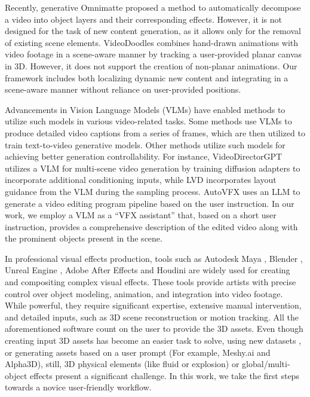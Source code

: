 Recently, generative Omnimatte \cite{generative-omnimatte} proposed a method to automatically decompose a video into object layers and their corresponding effects. However, it is not designed for the task of new content generation, as it allows only for the removal of existing scene elements. VideoDoodles \cite{videodoodles} combines hand-drawn animations with video footage in a scene-aware manner by tracking a user-provided planar canvas in 3D. However, it does not support the creation of non-planar animations. Our framework includes both localizing dynamic new content and integrating in a scene-aware manner without reliance on user-provided positions. 


Advancements in Vision Language Models (VLMs) have enabled 
methods to utilize such models in various video-related tasks. Some methods \cite{Chen2024Panda70MC7,yang2024cogvideox} use VLMs to produce detailed video captions from a series of frames, which are then utilized to train text-to-video generative models.
Other methods utilize such models for achieving better generation controllability. For instance, VideoDirectorGPT \cite{Lin2023VideoDirectorGPT} utilizes a VLM for multi-scene video generation by training diffusion adapters to incorporate additional conditioning inputs, while LVD \cite{lian2023llmgroundedvideo} incorporates layout guidance from the VLM during the sampling process. AutoVFX \cite{hsu2024autovfx} uses an LLM to generate a video editing program pipeline based on the user instruction. In our work, we employ a VLM as a ``VFX assistant'' that, based on a short user instruction, provides a comprehensive description of the edited video along with the prominent objects present in the scene.

In professional visual effects production, tools such as Autodesk Maya \cite{maya}, Blender \cite{blender}, Unreal Engine \cite{unrealengine}, Adobe After Effects \cite{christiansen2013adobe} and Houdini \cite{houdini} are widely used for creating and compositing complex visual effects. These tools provide artists with precise control over object modeling, animation, and integration into video footage. While powerful, they require significant expertise, extensive manual intervention, and detailed inputs, such as 3D scene reconstruction or motion tracking. All the aforementioned software count on the user to provide the 3D assets. Even though creating input 3D assets has become an easier task to solve, using new datasets \cite{objaverseXL, qiu2024richdreamer}, or generating assets based on a user prompt (For example, Meshy.ai and Alpha3D), still, 3D physical elements (like fluid or explosion) or global/multi-object effects present a significant challenge. In this work, we take the first steps towards a novice user-friendly workflow. 

